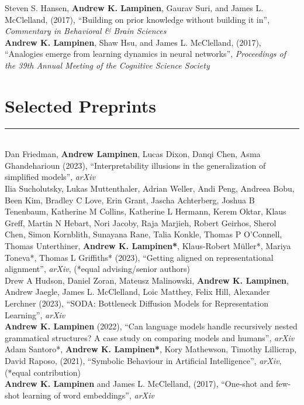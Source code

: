\documentclass[margin]{res}
\begin{document}
\begin{resume}
Steven S. Hansen, \textbf{Andrew K. Lampinen}, Gaurav Suri, and James L. McClelland, (2017), {``Building on prior knowledge without building it in'',} \textit{Commentary in Behavioral \& Brain Sciences}  \\[3pt]
\textbf{Andrew K. Lampinen}, Shaw Hsu, and James L. McClelland, (2017), {``Analogies emerge from learning dynamics in neural networks'',} \textit{Proceedings of the 39th Annual Meeting of the Cognitive Science Society}  

\vspace{1pt}\section{Selected\phantom{blah} Preprints} \vspace{-15pt} \rule{\textwidth}{0.5pt} \\[3pt]
Dan Friedman, \textbf{Andrew Lampinen}, Lucas Dixon, Danqi Chen, Asma Ghandeharioun (2023), {``Interpretability illusions in the generalization of simplified models'',} \textit{arXiv} \\[3pt]
Ilia Sucholutsky, Lukas Muttenthaler, Adrian Weller, Andi Peng, Andreea Bobu, Been Kim, Bradley C Love, Erin Grant, Jascha Achterberg, Joshua B Tenenbaum, Katherine M Collins, Katherine L Hermann, Kerem Oktar, Klaus Greff, Martin N Hebart, Nori Jacoby, Raja Marjieh, Robert Geirhos, Sherol Chen, Simon Kornblith, Sunayana Rane, Talia Konkle, Thomas P O'Connell, Thomas Unterthiner, \textbf{Andrew K. Lampinen*}, Klaus-Robert Müller*, Mariya Toneva*, Thomas L Griffiths* (2023), {``Getting aligned on representational alignment'',} \textit{arXiv}, (*equal advising/senior authors) \\[3pt]
Drew A Hudson, Daniel Zoran, Mateusz Malinowski, \textbf{Andrew K. Lampinen}, Andrew Jaegle, James L. McClelland, Loic Matthey, Felix Hill, Alexander Lerchner (2023), {``SODA: Bottleneck Diffusion Models for Representation Learning''}, \textit{arXiv} \\[3pt]
\textbf{Andrew K. Lampinen} (2022), {``Can language models handle recursively nested grammatical structures? A case study on comparing models and humans'',} \textit{arXiv} \\[3pt]
Adam Santoro*, \textbf{Andrew K. Lampinen*}, Kory Mathewson, Timothy Lillicrap, David Raposo, (2021), {``Symbolic Behaviour in Artificial Intelligence'',} \textit{arXiv}, (*equal contribution) \\[3pt] 
\textbf{Andrew K. Lampinen} and James L. McClelland, (2017), {``One-shot and few-shot learning of word embeddings'',} \textit{arXiv} 


\end{resume}
\end{document}
